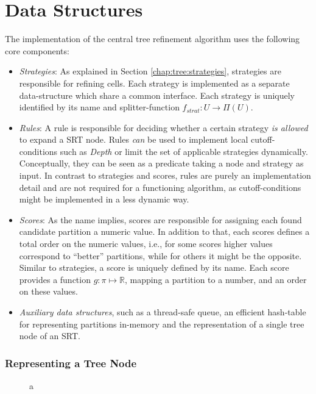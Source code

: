 	\section{Data Structures}
	\label{chap:impl:structures}

		The implementation of the central tree refinement algorithm uses the following core components:

		\begin{itemize}
			\item \textit{Strategies}: As explained in Section \ref{chap:tree:strategies}, strategies are responsible for refining cells. Each strategy is implemented as a separate data-structure which share a common interface. Each strategy is uniquely identified by its name and splitter-function $f_{strat}: U \rightarrow \Pi(U)$.
			\item \textit{Rules}: A rule is responsible for deciding whether a certain strategy \textit{is allowed} to expand a \ac{SRT} node. Rules \textit{can} be used to implement local cutoff-conditions such as \textit{Depth} or limit the set of applicable strategies dynamically. Conceptually, they can be seen as a predicate taking a node and strategy as input. In contrast to strategies and scores, rules are purely an implementation detail and are not required for a functioning algorithm, as cutoff-conditions might be implemented in a less dynamic way.
			\item \textit{Scores}: As the name implies, scores are responsible for assigning each found candidate partition a numeric value. In addition to that, each scores defines a total order on the numeric values, i.e., for some scores higher values correspond to \enquote{better} partitions, while for others it might be the opposite. Similar to strategies, a score is uniquely defined by its name. Each score provides a function $g: \pi \mapsto \mathbb{R}$, mapping a partition to a number, and an order on these values.
			\item \textit{Auxiliary data structures}, such as a thread-safe queue, an efficient hash-table for representing partitions in-memory and the representation of a single tree node of an \ac{SRT}.
		\end{itemize}

		\subsubsection{Representing a Tree Node}

			\begin{figure}[ht!]
				\centering
				
				\caption{a}
				\label{fig:impl:structures:node}
			\end{figure}

